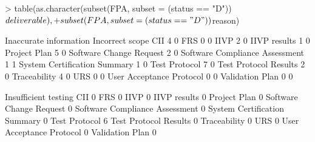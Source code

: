 \documentclass{article}
\begin{document}
\begin{Schunk}
\begin{Sinput}
> table(as.character(subset(FPA, subset = (status == "D"))$deliverable),
+       subset(FPA, subset = (status == "D"))$reason)
\end{Sinput}
\begin{Soutput}
                                 Inaccurate information Incorrect scope
  CII                                                 4               0
  FRS                                                 0               0
  IIVP                                                2               0
  IIVP results                                        1               0
  Project Plan                                        5               0
  Software Change Request                             2               0
  Software Compliance Assessment                      1               1
  System Certification Summary                        1               0
  Test Protocol                                       7               0
  Test Protocol Results                               2               0
  Traceability                                        4               0
  URS                                                 0               0
  User Acceptance Protocol                            0               0
  Validation Plan                                     0               0
                                
                                 Insufficient testing
  CII                                               0
  FRS                                               0
  IIVP                                              0
  IIVP results                                      0
  Project Plan                                      0
  Software Change Request                           0
  Software Compliance Assessment                    0
  System Certification Summary                      0
  Test Protocol                                     6
  Test Protocol Results                             0
  Traceability                                      0
  URS                                               0
  User Acceptance Protocol                          0
  Validation Plan                                   0
                                

\end{Soutput}
\end{Schunk}
\end{document}
